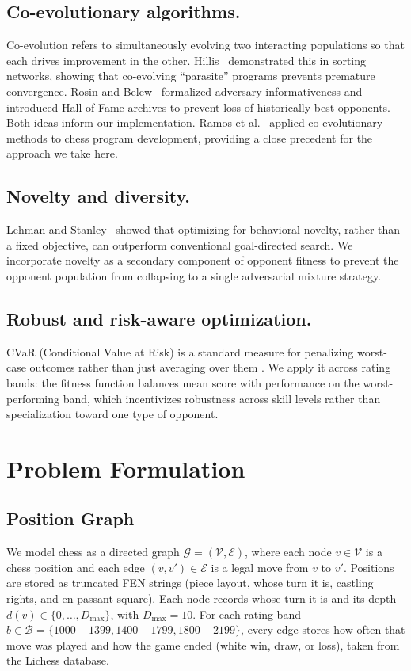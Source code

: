 \documentclass[conference]{IEEEtran}
\begin{document}
\subsection{Co-evolutionary algorithms.}
Co-evolution refers to simultaneously evolving two interacting populations so
that each drives improvement in the other. Hillis~\cite{hillis1990} demonstrated
this in sorting networks, showing that co-evolving ``parasite'' programs
prevents premature convergence. Rosin and Belew~\cite{rosin1997} formalized adversary informativeness and introduced Hall-of-Fame archives to prevent loss of historically best opponents. Both ideas inform our implementation. Ramos et al.~\cite{ramos2016} applied co-evolutionary methods to chess program development, providing a close precedent for the
approach we take here.

\subsection{Novelty and diversity.}
Lehman and Stanley~\cite{lehman2011} showed that optimizing for behavioral
novelty, rather than a fixed objective, can outperform conventional
goal-directed search. We incorporate novelty as a secondary component of
opponent fitness to prevent the opponent population from collapsing to a
single adversarial mixture strategy.

\subsection{Robust and risk-aware optimization.}
CVaR (Conditional Value at Risk) is a standard measure for penalizing
worst-case outcomes rather than just averaging over them
\cite{rockafellar2000}. We apply it across rating bands: the fitness function balances mean score with performance on the worst-performing band, which incentivizes robustness across skill levels rather than specialization toward one type of opponent.


\section{Problem Formulation}

\subsection{Position Graph}

We model chess as a directed graph $\mathcal{G} = (\mathcal{V}, \mathcal{E})$, where each node $v \in \mathcal{V}$ is a chess position and each edge $(v, v') \in \mathcal{E}$ is a legal move from $v$ to $v'$. Positions are stored as truncated FEN strings (piece layout, whose turn it is, castling rights, and en passant square). Each node records whose turn it is and its depth $d(v) \in \{0, \ldots, D_{\max}\}$, with $D_{\max} = 10$. For each rating band $b \in \mathcal{B} = \{1000\text{ -- }1399, 1400\text{ -- }1799, 1800\text{ -- }2199\}$, every edge stores how often that move was played and how the game ended (white win, draw, or loss), taken from the Lichess database.
\end{document}
